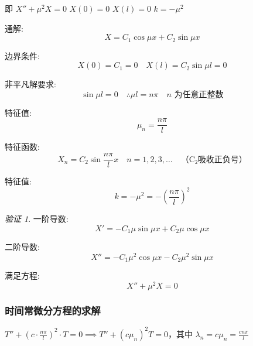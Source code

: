\documentclass[12pt,a4paper]{article}
\numberwithin{subsection}{section}   %
\numberwithin{subsubsection}{subsection}
\theoremstyle{plain}
\theoremstyle{definition}
\theoremstyle{remark}
\theoremstyle{remark}
\newtheorem{verification}[theorem]{验证}
\begin{document}
即 \(X'' + \mu^2 X = 0\) \quad \(X(0) = 0\) \quad \(X(l) = 0\) \quad \(k = -\mu^2\)
	
	通解:
	\begin{equation}
		X = C_1 \cos \mu x + C_2 \sin \mu x
	\end{equation}
	
	
	
	边界条件:
	\begin{equation}
		X(0) = C_1 = 0 \quad X(l) = C_2 \sin \mu l = 0
	\end{equation}
	
	非平凡解要求:
	\begin{equation}
		\sin \mu l = 0 \quad \therefore \mu l = n\pi \quad n \text{ 为任意正整数}
	\end{equation}
	
	特征值:
	\begin{equation}
		\mu_n = \frac{n\pi}{l}
	\end{equation}
	
	特征函数:
	\begin{equation}
		X_n = C_2 \sin \frac{n\pi}{l} x \quad n = 1, 2, 3, \ldots \quad \text{（C₂吸收正负号）}
	\end{equation}
	
	特征值:
	\begin{equation}
		k = -\mu^2 = -\left(\frac{n\pi}{l}\right)^2
	\end{equation}
	
	\begin{verification}	
		一阶导数:
		\begin{equation}
			X' = -C_1 \mu \sin \mu x + C_2 \mu \cos \mu x
		\end{equation}
		
		二阶导数:
		\begin{equation}
			X'' = -C_1 \mu^2 \cos \mu x - C_2 \mu^2 \sin \mu x
		\end{equation}
		
		满足方程:
		\begin{equation}
			X'' + \mu^2 X = 0
		\end{equation}
	\end{verification}	
	
	
	\subsubsection{时间常微分方程的求解}
	\(T'' + \left(c \cdot \frac{n\pi}{l}\right)^2 \cdot T = 0 \implies T'' + (c \mu_n)^2 T = 0\)，其中 \(\lambda_n = c \mu_n = \frac{c n \pi}{l}\)
	
\end{document}
